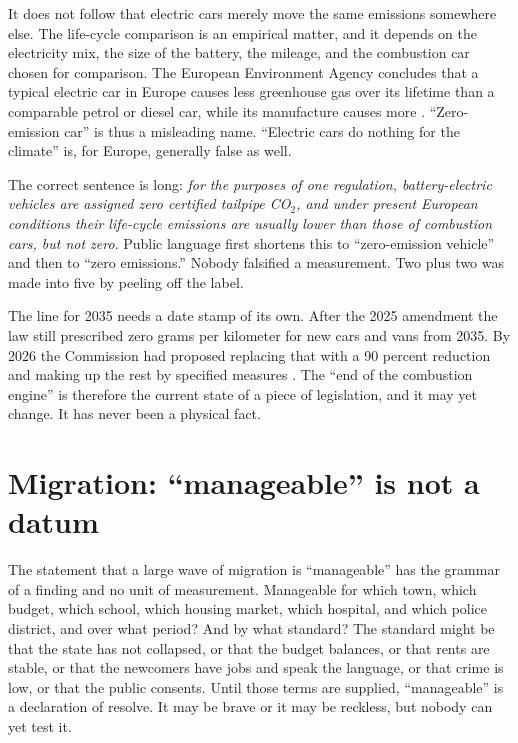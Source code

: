 \documentclass[12pt,a4paper]{book}
\begin{document}
It does not follow that electric cars merely move the same emissions somewhere else. The life-cycle comparison is an empirical matter, and it depends on the electricity mix, the size of the battery, the mileage, and the combustion car chosen for comparison. The European Environment Agency concludes that a typical electric car in Europe causes less greenhouse gas over its lifetime than a comparable petrol or diesel car, while its manufacture causes more \cite{EEAElectricVehiclesLifecycle}. ``Zero-emission car'' is thus a misleading name. ``Electric cars do nothing for the climate'' is, for Europe, generally false as well.

The correct sentence is long: \emph{for the purposes of one regulation, battery-electric vehicles are assigned zero certified tailpipe CO$_2$, and under present European conditions their life-cycle emissions are usually lower than those of combustion cars, but not zero}. Public language first shortens this to ``zero-emission vehicle'' and then to ``zero emissions.'' Nobody falsified a measurement. Two plus two was made into five by peeling off the label.

The line for 2035 needs a date stamp of its own. After the 2025 amendment the law still prescribed zero grams per kilometer for new cars and vans from 2035. By 2026 the Commission had proposed replacing that with a 90 percent reduction and making up the rest by specified measures \cite{EUCarCO2Standards}. The ``end of the combustion engine'' is therefore the current state of a piece of legislation, and it may yet change. It has never been a physical fact.

\section{Migration: ``manageable'' is not a datum}

The statement that a large wave of migration is ``manageable'' has the grammar of a finding and no unit of measurement. Manageable for which town, which budget, which school, which housing market, which hospital, and which police district, and over what period? And by what standard? The standard might be that the state has not collapsed, or that the budget balances, or that rents are stable, or that the newcomers have jobs and speak the language, or that crime is low, or that the public consents. Until those terms are supplied, ``manageable'' is a declaration of resolve. It may be brave or it may be reckless, but nobody can yet test it.
\end{document}
